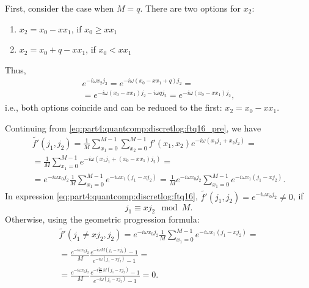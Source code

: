First, consider the case when $M = q$. There are two options for $x_2$:  
\begin{enumerate}
\item $x_2 = x_0 - x x_1$, if $x_0 \ge x x_1$
\item $x_2 = x_0 + q - x x_1$, if $x_0 < x x_1$
\end{enumerate}
Thus,
\begin{eqnarray}
e^{-i \omega x_2j_2} = e^{-i \omega\left(x_0 - x x_1 + q\right) j_2} = 
\nonumber \\
= e^{-i \omega\left(x_0 - x x_1\right) j_2 - i \omega q j_2} = 
e^{-i \omega\left(x_0 - x x_1\right) j_2},
\nonumber
\end{eqnarray}
i.e., both options coincide and can be reduced to the first:
$x_2 = x_0 - x x_1$.

Continuing from \eqref{eq:part4:quantcomp:discretlog:ftq16_pre}, we have
\begin{eqnarray}
\tilde{f'}\left(j_1, j_2\right) = 
\frac{1}{M}\sum_{x_1 = 0}^{M-1}\sum_{x_2 = 0}^{M-1} 
f'\left(x_1, x_2\right)e^{-i \omega\left(x_1 j_1 + x_2j_2\right)} =
\nonumber \\
=
 \frac{1}{M}\sum_{x_1 = 0}^{M-1}
e^{-i \omega\left(x_1 j_1 + (x_0 - x
   x_1) j_2\right)} = 
\nonumber \\
= e^{-i \omega x_0 j_2}\frac{1}{M}\sum_{x_1 = 0}^{M-1}
e^{-i  \omega x_1 \left(j_1 - x j_2\right)} =
\frac{1}{M} e^{-i \omega x_0 j_2} 
\sum_{x_1 = 0}^{M-1} e^{-i  \omega x_1 \left(j_1 - x j_2\right)}.
\label{eq:part4:quantcomp:discretlog:ftq16}
\end{eqnarray}
In expression \eqref{eq:part4:quantcomp:discretlog:ftq16}, $\tilde{f'}(j_1, j_2) = e^{-i \omega x_0 j_2} \ne 0$, if 
\begin{equation}
j_1 \equiv x j_2 \mod M.
\label{eq:part4:quantcomp:discretlog:j1xj2}
\end{equation} 
Otherwise, using the geometric progression formula:
\begin{eqnarray}
\tilde{f'}\left(j_1 \ne x j_2, j_2\right) = 
e^{-i \omega x_0 j_2}\frac{1}{M}
\sum_{x_1 = 0}^{M-1}e^{-i
  \omega x_1 \left(j_1 - x j_2\right)} = 
\nonumber \\
=
\frac{e^{-i \omega x_0 j_2}}{M} \frac{e^{-i
  \omega M \left(j_1 - x j_2\right)} - 1}{e^{-i
  \omega \left(j_1 - x j_2\right)} - 1} = 
\nonumber \\
=
 \frac{e^{-i \omega x_0 j_2}}{M} 
\frac{e^{-i \frac{2 \pi}{M} M \left(j_1 - x j_2\right)} - 1}{e^{-i
  \omega \left(j_1 - x j_2\right)} - 1} = 0.
\nonumber
\end{eqnarray} 

